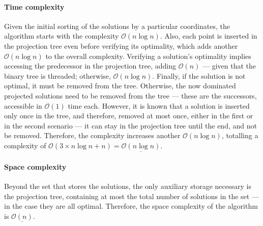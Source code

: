 \paragraph{Time complexity} Given the initial sorting of the solutions by a particular coordinates, the algorithm starts with the complexity $\mathcal{O}(n\log n)$. Also, each point is inserted in the projection tree even before verifying its optimality, which adds another $\mathcal{O}(n\log n)$ to the overall complexity. Verifying a solution's optimality implies accessing the predecessor in the projection tree, adding $\mathcal{O}(n)$ --- given that the binary tree is threaded; otherwise, $\mathcal{O}(n\log n)$. Finally, if the solution is not optimal, it must be removed from the tree. Otherwise, the now dominated projected solutions need to be removed from the tree --- these are the successors, accessible in $\mathcal{O}(1)$ time each. However, it is known that a solution is inserted only once in the tree, and therefore, removed at most once, either in the first or in the second scenario --- it can stay in the projection tree until the end, and not be removed. Therefore, the complexity increases another $\mathcal{O}(n\log n)$, totalling a complexity of $\mathcal{O}(3\times n\log n + n) = \underline{\mathcal{O}(n\log n)}$.

\paragraph{Space complexity} Beyond the set that stores the solutions, the only auxiliary storage necessary is the projection tree, containing at most the total number of solutions in the set --- in the case they are all optimal. Therefore, the space complexity of the algorithm is $\underline{\mathcal{O}(n)}$. 